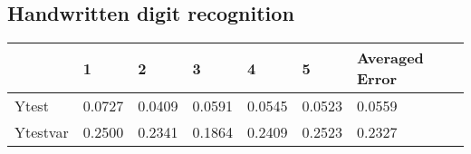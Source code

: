 \documentclass[a4paper,11pt]{article}
\begin{document}
\subsection{Handwritten digit recognition}
\begin{tabular}{|l|l|l|l|l|l|l|}
	\hline
	& 1 & 2 &  3 & 4 & 5 & Averaged Error \\ \hline
	Ytest & 0.0727  & 0.0409    & 0.0591   & 0.0545   & 0.0523  & 0.0559          \\ \hline
	Ytestvar & 0.2500  & 0.2341  & 0.1864   & 0.2409   & 0.2523  & 0.2327          \\ \hline
\end{tabular}
\end{document}
